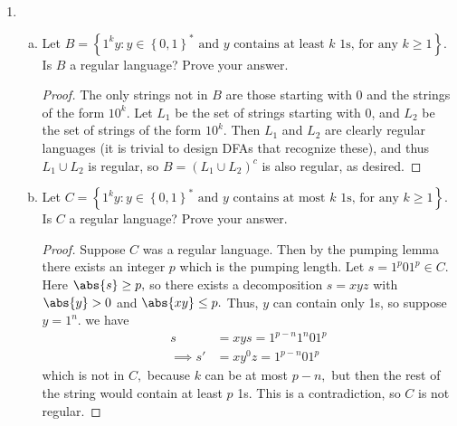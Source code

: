 \documentclass{article}
\begin{document}
\begin{enumerate}
\begin{enumerate}[(a)]
		\end{enumerate}

		\newpage
	\item
		\begin{enumerate}[(a)]
			\item Let $B=\left\{ 1^k y:y\in\left\{ 0, 1 \right\}^*\text{ and } y\text{ contains at least }k\text{ 1s, for any }k\ge 1 \right\}.$ Is $B$ a regular language? Prove your answer.
				\begin{proof}
					The only strings not in $B$ are those starting with 0 and the strings of the form $10^k.$ Let $L_1$ be the set of strings starting with 0, and $L_2$ be the set of strings of the form $10^k.$ Then $L_1$ and $L_2$ are clearly regular languages (it is trivial to design DFAs that recognize these), and thus $L_1\cup L_2$ is regular, so $B=\left( L_1\cup L_2 \right)^c$ is also regular, as desired.
				\end{proof}

			\item Let $C=\left\{ 1^k y:y\in\left\{ 0, 1 \right\}^*\text{ and } y\text{ contains at most }k\text{ 1s, for any }k\ge 1 \right\}.$ Is $C$ a regular language? Prove your answer.
				\begin{proof}
					Suppose $C$ was a regular language. Then by the pumping lemma there exists an integer $p$ which is the pumping length. Let $s=1^p01^p\in C.$ Here $\abs{s}\ge p,$ so there exists a decomposition $s=xyz$ with $\abs{y}>0$ and $\abs{xy}\le p.$ Thus, $y$ can contain only 1s, so suppose $y=1^n.$ we have
					\begin{align*}
						s &= xys = 1^{p-n}1^n01^{p} \\
						\implies s' &= xy^0z = 1^{p-n}01^{p}
					\end{align*}
					which is not in $C,$ because $k$ can be at most $p-n,$ but then the rest of the string would contain at least $p$ 1s. This is a contradiction, so $C$ is not regular.
				\end{proof}

		\end{enumerate}


\end{enumerate}
\end{document}
